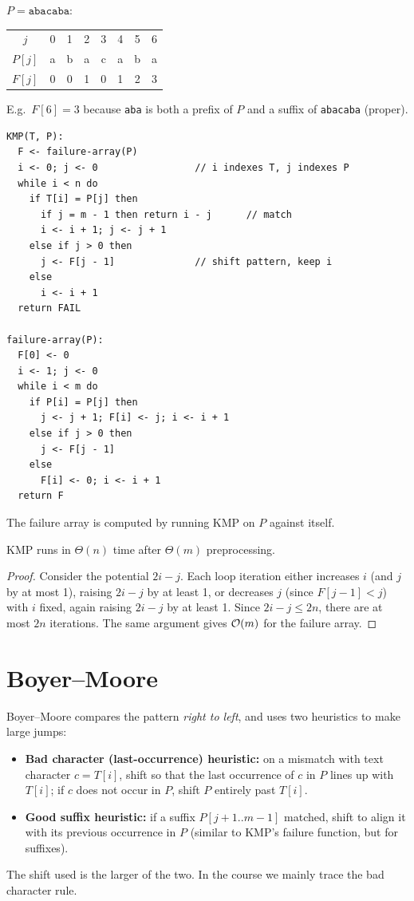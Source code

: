 \begin{example}
$P = \texttt{abacaba}$:
\begin{center}
\begin{tabular}{c|ccccccc}
$j$ & 0 & 1 & 2 & 3 & 4 & 5 & 6\\
$P[j]$ & a & b & a & c & a & b & a\\
\hline
$F[j]$ & 0 & 0 & 1 & 0 & 1 & 2 & 3
\end{tabular}
\end{center}
E.g.\ $F[6] = 3$ because \texttt{aba} is both a prefix of $P$ and a suffix of
\texttt{abacaba} (proper).
\end{example}

\begin{lstlisting}
KMP(T, P):
  F <- failure-array(P)
  i <- 0; j <- 0                 // i indexes T, j indexes P
  while i < n do
    if T[i] = P[j] then
      if j = m - 1 then return i - j      // match
      i <- i + 1; j <- j + 1
    else if j > 0 then
      j <- F[j - 1]              // shift pattern, keep i
    else
      i <- i + 1
  return FAIL

failure-array(P):
  F[0] <- 0
  i <- 1; j <- 0
  while i < m do
    if P[i] = P[j] then
      j <- j + 1; F[i] <- j; i <- i + 1
    else if j > 0 then
      j <- F[j - 1]
    else
      F[i] <- 0; i <- i + 1
  return F
\end{lstlisting}
The failure array is computed by running KMP on $P$ against itself.

\begin{theorem}
KMP runs in $\Theta(n)$ time after $\Theta(m)$ preprocessing.
\end{theorem}
\begin{proof}
Consider the potential $2i - j$. Each loop iteration either increases $i$ (and
$j$ by at most 1), raising $2i - j$ by at least 1, or decreases $j$ (since
$F[j-1] < j$) with $i$ fixed, again raising $2i - j$ by at least 1. Since
$2i - j \le 2n$, there are at most $2n$ iterations. The same argument gives
$\mathcal{O}(m)$ for the failure array.
\end{proof}

\section{Boyer--Moore}

Boyer--Moore compares the pattern \emph{right to left}, and uses two heuristics
to make large jumps:
\begin{itemize}
  \item \textbf{Bad character (last-occurrence) heuristic:} on a mismatch with
        text character $c = T[i]$, shift so that the last occurrence of $c$ in
        $P$ lines up with $T[i]$; if $c$ does not occur in $P$, shift $P$ entirely
        past $T[i]$.
  \item \textbf{Good suffix heuristic:} if a suffix $P[j+1..m-1]$ matched,
        shift to align it with its previous occurrence in $P$ (similar to KMP's
        failure function, but for suffixes).
\end{itemize}
The shift used is the larger of the two. In the course we mainly trace the bad
character rule.

